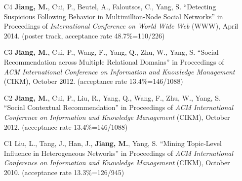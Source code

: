 \documentclass[10pt]{article}
\newenvironment{myindentpar}[1]%
{\begin{list}{}%
         {\setlength{\leftmargin}{#1}}%
         \item[]%
}
{\end{list}}
\newcounter{list}
\newcommand{\hide}[1]{}
\begin{document}
\begin{myindentpar}{0.00cm}
\begin{enumerate}[leftmargin=.5cm]
	\hide{\vspace{-0.1cm}\hspace{0.5cm}{\small \emph{I conceived the idea, designed the study, did the experiments, and wrote the paper.}}}

\item[C4] \textbf{Jiang, M.}, Cui, P., Beutel, A., Faloutsos, C., Yang, S. ``Detecting Suspicious Following Behavior in Multimillion-Node Social Networks'' in Proceedings of \emph{International Conference on World Wide Web} (WWW), April 2014. (poster track, acceptance rate 48.7\%=110/226)

	\hide{\vspace{-0.1cm}\hspace{0.5cm}{\small \emph{I conceived the idea, designed the study, did the experiments, and wrote the paper.}}}

\item[C3] \textbf{Jiang, M.}, Cui, P., Wang, F., Yang, Q., Zhu, W., Yang, S. ``Social Recommendation across Multiple Relational Domains'' in Proceedings of \emph{ACM International Conference on Information and Knowledge Management} (CIKM), October 2012. (acceptance rate 13.4\%=146/1088)

	\hide{\vspace{-0.1cm}\hspace{0.5cm}{\small \emph{I conceived the idea in consultation with Dr. Wang. I designed the study, completed the experiments, and wrote the paper. Dr. Cui edited the paper.}}}

\item[C2] \textbf{Jiang, M.}, Cui, P., Liu, R., Yang, Q., Wang, F., Zhu, W., Yang, S. ``Social Contextual Recommendation'' in Proceedings of \emph{ACM International Conference on Information and Knowledge Management} (CIKM), October 2012. (acceptance rate 13.4\%=146/1088)

	\hide{\vspace{-0.1cm}\hspace{0.5cm}{\small \emph{I conceived the idea in consultation with Dr. Cui. I designed the study, completed the experiments, and wrote the paper. Dr. Cui edited the paper.}}}

\item[C1] Liu, L., Tang, J., Han, J., \textbf{Jiang, M.}, Yang, S. ``Mining Topic-Level Influence in Heterogeneous Networks'' in Proceedings of \emph{ACM International Conference on Information and Knowledge Management} (CIKM), October 2010. (acceptance rate 13.3\%=126/945)


\end{enumerate}
\end{myindentpar}
\end{document}
